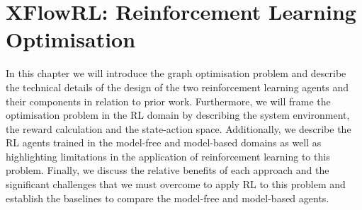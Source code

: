 \chapter{XFlowRL: Reinforcement Learning Optimisation}
In this chapter we will introduce the graph optimisation problem and describe the technical details of the design of the two reinforcement learning agents and their components in relation to prior work. Furthermore, we will frame the optimisation problem in the RL domain by describing the system environment, the reward calculation and the state-action space. Additionally, we describe the RL agents trained in the model-free and model-based domains as well as highlighting limitations in the application of reinforcement learning to this problem. Finally, we discuss the relative benefits of each approach and the significant challenges that we must overcome to apply RL to this problem and establish the baselines to compare the model-free and model-based agents.






